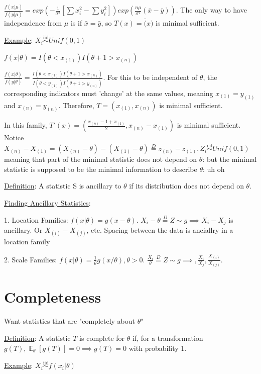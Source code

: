 \documentclass{article}
\DeclareMathOperator{\EX}{\mathbb{E}} %
\let\Oldsum=\sum
\renewcommand{\sum}{\Oldsum\limits}
\newcommand{\iiddist}{\overset{\mathrm{iid}}{\sim}}
\begin{document}
$\frac{f(x|\mu)}{f(y|\mu)} = exp(-\frac{1}{\sigma^2}[\sum x_i^2 - \sum y_i^2])exp(\frac{n\mu}{\sigma^2}(\bar{x} - \bar{y}))$. The only way to have independence from $\mu$ is if $\bar{x} = \bar{y}$, so $T(x) = \bar(x)$ is minimal sufficient.

\underline{Example}: $X_i \iiddist Unif(0, 1)$

$f(x|\theta) = I(\theta < x_{(1)})I(\theta+1 > x_{(n)})$

$\frac{f(x|\theta)}{f(y|\theta)} = \frac{I(\theta < x_{(1)})I(\theta+1 > x_{(n)})}{I(\theta < y_{(1)})I(\theta+1 > y_{(n)})}$. For this to be independent of $\theta$, the corresponding indicators must 'change' at the same values, meaning $x_{(1)} = y_{(1)}$ and $x_{(n)} = y_{(n)}$. Therefore, $T = (x_{(1)}, x_{(n)})$ is minimal sufficient.

In this family, $T'(x) = (\frac{x_{(n)}- 1 + x_{(1)}}{2}, x_{(n)} - x_{(1)})$ is minimal sufficient. Notice $X_{(n)} - X_{(1)} = (X_{(n)} - \theta) - (X_{(1)} - \theta) \overset{D}{=} z_{(n)} - z_{(1)}, Z_i \iiddist Unif(0, 1)$ meaning that part of the minimal statistic does not depend on $\theta$: but the minimal statistic is supposed to be the minimal information to describe $\theta$: uh oh

\underline{Definition}: A statistic S is ancillary to $\theta$ if its distribution does not depend on $\theta$.

\underline{Finding Ancillary Statistics}:

1. Location Families: $f(x|\theta) = g(x-\theta)$. $X_i - \theta \overset{D}{=} Z \sim g \implies X_i - X_j$ is ancillary. Or $X_{(i)} - X_{(j)}$, etc. Spacing between the data is anciallry in a location family

2. Scale Families: $f(x|\theta) = \frac{1}{\theta}g(x/\theta), \theta > 0$. $\frac{X_i}{\theta} \overset{D}{=} Z \sim g \implies, \frac{X_i}{X_j}, \frac{X_{(i)}}{X_{(j)}}$.

\section{Completeness}

Want statistics that are "completely about $\theta$"

\underline{Definition}: A statistic $T$ is complete for $\theta$ if, for a transformation $g(T), \EX_{\theta}[g(T)] = 0 \implies g(T) = 0$ with probability 1. 

\underline{Example}: $X_i \iiddist f(x_i|\theta)$
\end{document}
